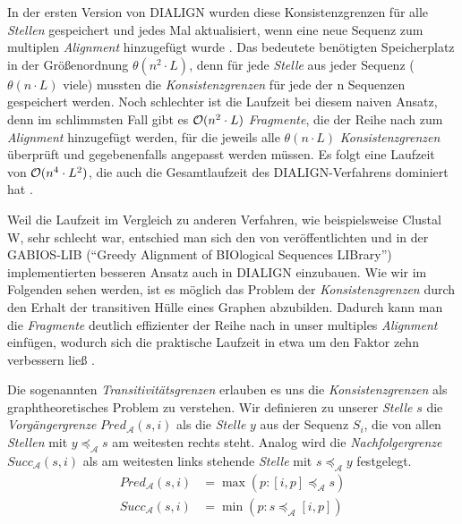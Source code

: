 In der ersten Version von DIALIGN wurden diese Konsistenzgrenzen für alle \emph{Stellen} gespeichert und jedes Mal aktualisiert, wenn eine neue Sequenz zum multiplen \emph{Alignment} hinzugefügt wurde \citep{mdw96}. Das bedeutete benötigten Speicherplatz in der Größenordnung $\theta(n^2\cdot L)$, denn für jede \emph{Stelle} aus jeder Sequenz ($\theta(n\cdot L)$ viele) mussten die \emph{Konsistenzgrenzen} für jede der n Sequenzen gespeichert werden. Noch schlechter ist die Laufzeit bei diesem naiven Ansatz, denn im schlimmsten Fall gibt es $\mathcal{O}(n^2\cdot L)$ \emph{Fragmente}, die der Reihe nach zum \emph{Alignment} hinzugefügt werden, für die jeweils alle $\theta(n\cdot L)$ \emph{Konsistenzgrenzen} überprüft und gegebenenfalls angepasst werden müssen. Es folgt eine Laufzeit von $\mathcal{O}(n^4\cdot L^2)$, die auch die Gesamtlaufzeit des DIALIGN-Verfahrens dominiert hat \citep{m99}. 

Weil die Laufzeit im Vergleich zu anderen Verfahren, wie beispielsweise Clustal W, sehr schlecht war, entschied man sich den von \cite{a97} veröffentlichten und in der GABIOS-LIB (\enquote{Greedy Alignment of BIOlogical Sequences LIBrary}) implementierten besseren Ansatz auch in DIALIGN	einzubauen. Wie wir im Folgenden sehen werden, ist es möglich das Problem der \emph{Konsistenzgrenzen} durch den Erhalt der transitiven Hülle eines Graphen abzubilden. Dadurch kann man die \emph{Fragmente} deutlich effizienter der Reihe nach in unser multiples \emph{Alignment} einfügen, wodurch sich die praktische Laufzeit in etwa um den Faktor zehn verbessern ließ \citep{am00}. 

\begin{definition}[Transitivitätsgrenzen]
	Die sogenannten \emph{Transitivitätsgrenzen} erlauben es uns die \emph{Konsistenzgrenzen} als graphtheoretisches Problem zu verstehen. Wir definieren zu unserer \emph{Stelle} $s$ die \emph{Vorgängergrenze} $Pred_{\mathcal{A}}(s,i)$ als die \emph{Stelle} $y$ aus der Sequenz $S_i$, die von allen \emph{Stellen} mit $y \preceq_{\mathcal{A}} s$ am weitesten rechts steht. Analog wird die \emph{Nachfolgergrenze} $Succ_{\mathcal{A}}(s,i)$ als am weitesten links stehende \emph{Stelle} mit $s \preceq_{\mathcal{A}} y$ festgelegt.
	\begin{equation}
	\begin{split}
		Pred_{\mathcal{A}}(s,i) &= \max(p: [i,p] \preceq_{\mathcal{A}} s) \\
		Succ_{\mathcal{A}}(s,i) &= \min(p: s \preceq_{\mathcal{A}} [i,p])
	\end{split}
	\end{equation}
\end{definition}

